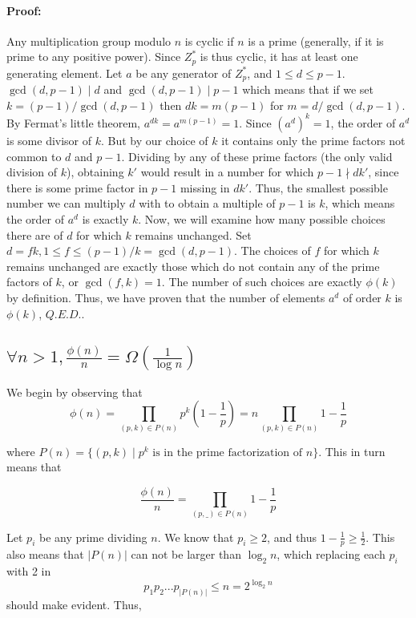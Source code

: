 \documentclass{article}
\newcommand{\z}[1]{Z^*_{#1}}
\begin{document}
\paragraph{Proof:} Any multiplication group modulo $n$ is cyclic if $n$ is a
prime (generally, if it is prime to any positive power). Since $\z p$ is thus
cyclic, it has at least one generating element. Let $a$ be any generator of $\z
p$, and $1 \leq d \leq p-1$. $\gcd(d, p-1) \mid d$ and $\gcd(d, p-1) \mid p-1$
which means that if we set $k=(p-1)/\gcd(d,p-1)$ then $dk = m(p-1)$ for $m = d /
\gcd(d, p-1)$. By Fermat's little theorem, $a^{dk} = a^{m(p-1)} = 1$. Since
$(a^d)^k = 1$, the order of $a^d$ is some divisor of $k$. But by our choice of
$k$ it contains only the prime factors not common to $d$ and $p-1$. Dividing by
any of these prime factors (the only valid division of $k$), obtaining $k'$
would result in a number for which $p -1 \nmid dk'$, since there is some prime
factor in $p-1$ missing in $dk'$. Thus, the smallest possible number we can
multiply $d$ with to obtain a multiple of $p-1$ is $k$, which means the order of
$a^d$ is exactly $k$. Now, we will examine how many possible choices there are
of $d$ for which $k$ remains unchanged. Set $d = fk, 1 \leq f \leq (p-1)/k =
\gcd(d, p-1)$. The choices of $f$ for which $k$ remains unchanged are exactly
those which do not contain any of the prime factors of $k$, or $\gcd(f, k) = 1$.
The number of such choices are exactly $\phi(k)$ by definition. Thus, we have
proven that the number of elements $a^d$ of order $k$ is $\phi(k)$, $Q.E.D.$.

\subsection{$\forall n > 1, \frac{\phi(n)}{n} = \Omega\left( \frac{1}{\log n} \right)$}

We begin by observing that
$$\phi(n) = \prod_{(p, k) \in P(n)}p^k\left(1-\frac{1}{p}\right) = n \prod_{(p, k) \in P(n)}1-\frac{1}{p}$$

\noindent where $P(n) = \{(p,k) \mid p^k\text{ is in the prime factorization of } n\}$. This
in turn means that

$$ \frac{\phi(n)}{n} = \prod_{(p,\_) \in P(n)}1 - \frac{1}{p}$$

Let $p_i$ be any prime dividing $n$. We know that $p_i \geq 2$, and thus $1
-\frac{1}{p} \geq \frac{1}{2}$. This also means that $|P(n)|$ can not be larger
than $\log_2 n$, which replacing each $p_i$ with 2 in
$$ p_1p_2...p_{|P(n)|} \leq n = 2^{\log_2 n}$$
\noindent should make evident. Thus, 
\end{document}
